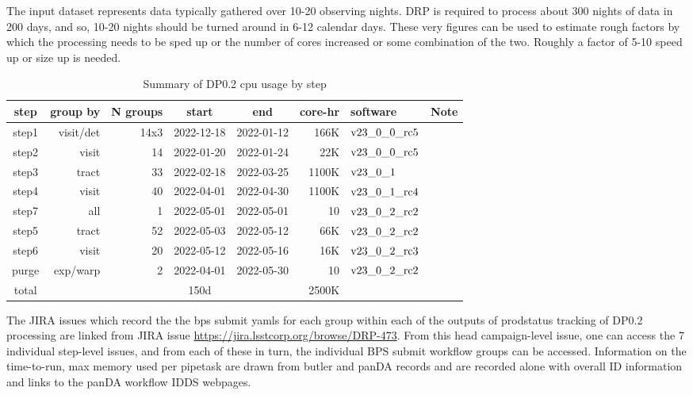 \documentclass[OPS,authoryear,toc]{lsstdoc}
\begin{document}
The input dataset represents data typically gathered over 10-20
observing nights.  DRP is required to process about 300 nights of data
in 200 days, and so, 10-20 nights should be turned around in 6-12
calendar days.  These very figures can be used to estimate rough
factors by which the processing needs to be sped up or the number of
cores increased or some combination of the two.  Roughly a factor of
5-10 speed up or size up is needed.


\begin{center}
\begin{table}[ht]
\caption{Summary of DP0.2 cpu usage by step}
\begin{tabular} { |c|r|r|c|c|r|l|l|}
\hline
step & group by & N groups & start & end & core-hr & software & Note\\
\hline
step1 & visit/det & 14x3 &2022-12-18& 2022-01-12 & 166K & $\rm v23\_0\_0\_rc5$ &\\
step2 & visit  & 14 & 2022-01-20& 2022-01-24 & 22K & $\rm v23\_0\_0\_rc5$ &\\
step3 & tract & 33 & 2022-02-18& 2022-03-25 & 1100K & $\rm v23\_0\_1$ &\\
step4 & visit & 40& 2022-04-01& 2022-04-30 & 1100K & $\rm v23\_0\_1\_rc4$ &\\
step7 & all & 1 & 2022-05-01& 2022-05-01 & 10 & $\rm v23\_0\_2\_rc2$ &\\
step5 & tract & 52 & 2022-05-03& 2022-05-12 & 66K & $\rm v23\_0\_2\_rc2$ &\\
step6 & visit & 20&2022-05-12& 2022-05-16 & 16K & $\rm v23\_0\_2\_rc3$ &\\
purge & exp/warp & 2 & 2022-04-01& 2022-05-30 & 10 & $\rm v23\_0\_2\_rc2$ & \\
\hline
total & & & 150d & & 2500K &&\\
\hline
\end{tabular}
\label{tab:summarycpu}
\end{table}
\end{center}

The JIRA issues which record the the bps submit yamls for each group
within each of the outputs of {\rm prodstatus} tracking of DP0.2
processing are linked from JIRA issue
\url{https://jira.lsstcorp.org/browse/DRP-473}.  From this head
campaign-level issue, one can access the 7 individual step-level
issues, and from each of these in turn, the individual BPS submit
workflow groups can be accessed.  Information on the time-to-run, max
memory used per pipetask are drawn from butler and panDA records and
are recorded alone with overall ID information and links to the panDA
workflow IDDS webpages.
\end{document}
